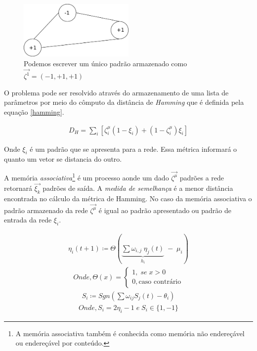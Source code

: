 \begin{figure}[H]
	\centering
	\includegraphics[width=0.5\textwidth]{Imagens/Fig19.png}
	\caption{Podemos escrever um único padrão armazenado como $\vec{\zeta^{1}}=(-1,+1,+1)$}
	\label{1padrao}
\end{figure}

O problema pode ser resolvido através do armazenamento de uma lista de parâmetros por meio do cômputo da distância de \textit{Hamming} que é definida pela equação \ref{hamming}.

\begin{eqnarray}
D_{H} = \sum_{i} [ \zeta^{\mu}_{i} (1-\xi_{i}) + (1 - \zeta^{\mu}_{i}) \xi_{i}]
\label{hamming}
\end{eqnarray}

Onde $\xi_{i}$ é um padrão que se apresenta para a rede. Essa métrica informará o quanto um vetor se distancia do outro.

A memória \textit{associativa}\footnote{A memória associativa também é conhecida como memória não endereçável ou endereçável por conteúdo.} é um processo aonde um dado $\vec{\zeta^{\mu}}$ padrões a rede retornará $\vec{\xi_{k}}$ padrões de saída. A \textit{medida de semelhança} é a menor distância encontrada no cálculo da métrica de Hamming. No caso da memória associativa o padrão armazenado da rede $\vec{\zeta^{\mu}}$ é igual ao padrão apresentado ou padrão de entrada da rede $\xi_{i}$.

\begin{tcolorbox}[colback=green!5,colframe=green!40!black,title=Faça a transformação de variáveis de \ref{ni} para \ref{si}.]
	\begin{eqnarray}
		\eta_{i}(t+1) \coloneqq \Theta\left( \underbrace{\sum \omega_{i,j}\; \eta_{j}(t)}_{h_{i}}\;-\;\mu_{i}\right) 
		\label{ni}
	\end{eqnarray}
	\begin{eqnarray}
	Onde, 
		\Theta(x)=
		\begin{cases}
		1,\; se\; x>0 \\ 
		0, \text{caso contrário}
		\end{cases} \nonumber
	\end{eqnarray}
	\begin{eqnarray}
		S_{i} \coloneqq Sgn (\sum \omega_{ij} S_{j}(t) - \theta_{i} )
		\label{si}
	\end{eqnarray}
	\begin{eqnarray}
	    Onde,
		S_{i}= 2\eta_{i}-1\; e\;  S_{i} \in\{1,-1\} \nonumber
	\end{eqnarray}
	
\end{tcolorbox}



 

\pagebreak
 
 

